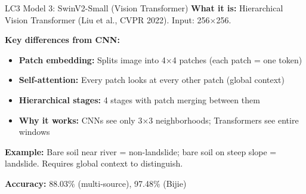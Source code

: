 \documentclass[aspectratio=169]{beamer}
\begin{document}
\begin{frame}{LC3 Model 3: SwinV2-Small (Vision Transformer)}
    \textbf{What it is:} Hierarchical Vision Transformer (Liu et al., CVPR 2022). Input: 256$\times$256.

    \vspace{0.2cm}
    \textbf{Key differences from CNN:}
    \begin{itemize}
        \item \textbf{Patch embedding:} Splits image into 4×4 patches (each patch = one token)
        \item \textbf{Self-attention:} Every patch looks at every other patch (global context)
        \item \textbf{Hierarchical stages:} 4 stages with patch merging between them
        \item \textbf{Why it works:} CNNs see only 3×3 neighborhoods; Transformers see entire windows
    \end{itemize}

    \vspace{0.2cm}
    \textbf{Example:} Bare soil near river = non-landslide; bare soil on steep slope = landslide. Requires global context to distinguish.

    \vspace{0.2cm}
    \textbf{Accuracy:} 88.03\% (multi-source), 97.48\% (Bijie)
\end{frame}
\end{document}
